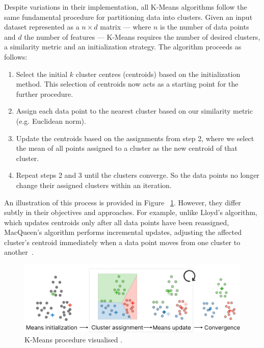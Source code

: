\documentclass[10pt,twocolumn,letterpaper]{article}
\begin{document}
Despite variations in their implementation, all K-Means algorithms follow the
same fundamental procedure for partitioning data into clusters. Given an input
dataset represented as a $n \times d$ matrix — where $n$ is the number of data
points and $d$ the number of features — K-Means requires the number of desired
clusters, a similarity metric and an initialization strategy. The algorithm
proceeds as follows:
\begin{enumerate}
    \item Select the initial $k$ cluster centres (centroids) based on the initialization
          method. This selection of centroids now acts as a starting point for the
          further procedure.
    \item Assign each data point to the nearest cluster based on our similarity metric
          (e.g. Euclidean norm).
    \item Update the centroids based on the assignments from step 2, where we select the
          mean of all points assigned to a cluster as the new centroid of that cluster.
    \item Repeat steps 2 and 3 until the clusters converge. So the data points no longer
          change their assigned clusters within an iteration.
\end{enumerate}
An illustration of this process is provided in Figure
~\ref{fig:kmeans-procedure}. However, they differ subtly in their objectives
and approaches. For example, unlike Lloyd's algorithm, which updates centroids
only after all data points have been reassigned, MacQueen's algorithm performs
incremental updates, adjusting the affected cluster’s centroid immediately when
a data point moves from one cluster to another~\cite{Morissette2013}.

\begin{figure}[t]
    \begin{center}
        \includegraphics[width=0.8\linewidth]{figures/K-Means procedure}
    \end{center}
    \caption{K-Means procedure visualised \cite{Amidi2018}.}
    \label{fig:kmeans-procedure}
\end{figure}
\end{document}
